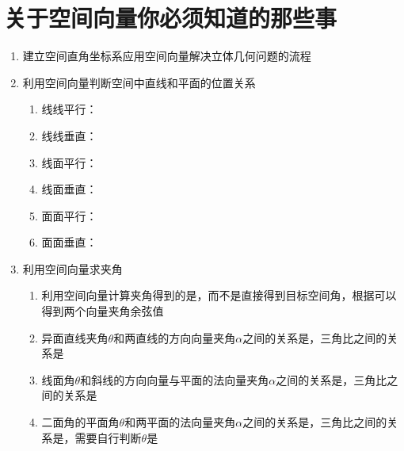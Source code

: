 \section*{关于空间向量你必须知道的那些事}
\begin{enumerate}
    \item 建立空间直角坐标系应用空间向量解决立体几何问题的流程

    \item 利用空间向量判断空间中直线和平面的位置关系
    \begin{enumerate}
        \item 线线平行：
        \item 线线垂直：
        \item 线面平行：
        \item 线面垂直：
        \item 面面平行：
        \item 面面垂直：
    \end{enumerate}

    \item 利用空间向量求夹角
    \begin{enumerate}
        \item 利用空间向量计算夹角得到的是，而不是直接得到目标空间角，根据可以得到两个向量夹角余弦值
        \item 异面直线夹角$\theta$和两直线的方向向量夹角$\alpha$之间的关系是，三角比之间的关系是
        \item 线面角$\theta$和斜线的方向向量与平面的法向量夹角$\alpha$之间的关系是，三角比之间的关系是
        \item 二面角的平面角$\theta$和两平面的法向量夹角$\alpha$之间的关系是，三角比之间的关系是，需要自行判断$\theta$是
    \end{enumerate}



\end{enumerate}
